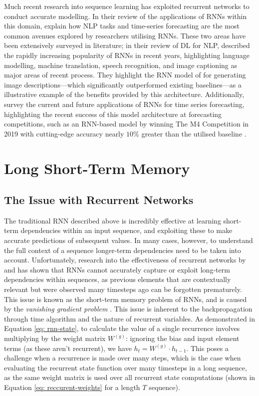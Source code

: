 \documentclass[a4paper, 11pt]{report}
\begin{document}
    Much recent research into sequence learning has exploited recurrent networks to conduct accurate modelling. In their review of the applications of RNNs within this domain, \citet{lipton-2015} explain how NLP tasks and time-series forecasting are the most common avenues explored by researchers utilising RNNs. These two areas have been extensively surveyed in literature; in their review of DL for NLP, described the rapidly increasing popularity of RNNs in recent years, highlighting language modelling, machine translation, speech recognition, and image captioning as major areas of recent process. They highlight the RNN model of \citet{karpathy-2015} for generating image descriptions---which significantly outperformed existing baselines---as a illustrative example of the benefits provided by this architecture. Additionally, \citet{hewamalage-2021} survey the current and future applications of RNNs for time series forecasting, highlighting the recent success of this model architecture at forecasting competitions, such as an RNN-based model by \citet{smyl-2020} winning The M4 Competition in 2019 with cutting-edge accuracy nearly $10\%$ greater than the utilised baseline \citep{makridakis-2020}.


    \section{Long Short-Term Memory}

    \subsection{The Issue with Recurrent Networks}

    The traditional RNN described above is incredibly effective at learning short-term dependencies within an input sequence, and exploiting these to make accurate predictions of subsequent values. In many cases, however, to understand the full context of a sequence longer-term dependencies need to be taken into account. Unfortunately, research into the effectiveness of recurrent networks by \citet{hochreiter-1991} and \citet{bengio-1994} has shown that RNNs cannot accurately capture or exploit long-term dependencies within sequences, as previous elements that are contextually relevant but were observed many timesteps ago can be forgotten prematurely. This issue is known as the short-term memory problem of RNNs, and is caused by the \emph{vanishing gradient problem} \citep{hochreiter-1991}. This issue is inherent to the backpropagation through time algorithm and the nature of recurrent variables. As demonstrated in Equation \ref{eq: rnn-state}, to calculate the value of a single recurrence involves multiplying by the weight matrix $W^{(g)}$: ignoring the bias and input element terms (as these aren't recurrent), we have $h_t = W^{(g)} \cdot h_{t-1}$. This poses a challenge when a recurrence is made over many steps, which is the case when evaluating the recurrent state function over many timesteps in a long sequence, as the same weight matrix is used over all recurrent state computations (shown in Equation \ref{eq: reccurent-weights} for a length $T$ sequence).
\end{document}
